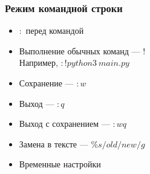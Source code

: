 \documentclass[aspectratio=169]{beamer}
\begin{document}
    \begin{frame}\frametitle{Режим командной строки}
        \begin{itemize}
            \item $:$ перед командой
            \item Выполнение обычных команд --- $!$\\
                Например, $:!python3\ main.py$
            \item Сохранение --- $:w$
            \item Выход --- $:q$
            \item Выход с сохранением --- $:wq$
            \item Замена в тексте --- $\%s/old/new/g$
            \item Временные настройки
        \end{itemize}
    \end{frame}
\end{document}
